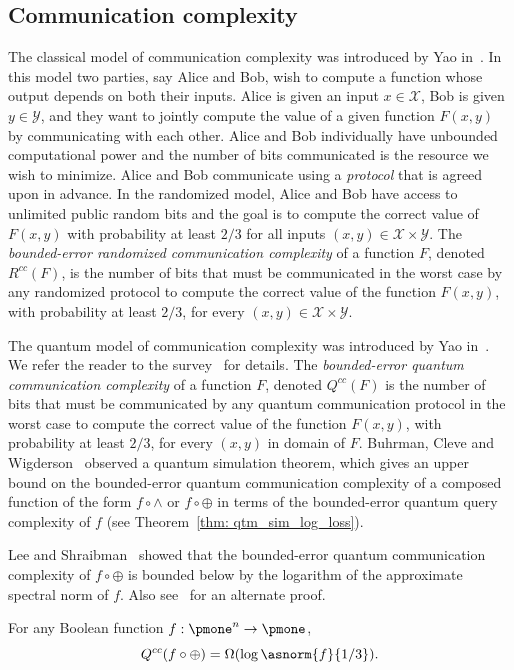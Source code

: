 \subsection{Communication complexity}
The classical model of communication complexity was introduced by Yao in~\cite{Yao79}. In this model two parties, say Alice and Bob, wish to compute a function whose output depends on both their inputs. Alice is given an input $x \in \mathcal{X}$, Bob is given $y \in \mathcal{Y}$, and they want to jointly compute the value of a given function $F(x,y)$ by communicating with each other.  Alice and Bob individually have unbounded computational power and the number of bits communicated is the resource we wish to minimize. Alice and Bob communicate using a \emph{protocol} that is agreed upon in advance. In the randomized model, Alice and Bob have access to unlimited public random bits and the goal is to compute the correct value of $F(x,y)$ with probability at least $2/3$ for all inputs $(x,y) \in \mathcal{X} \times \mathcal{Y}$. The \emph{bounded-error randomized communication complexity} of a function $F$, denoted $R^{cc}(F)$, is the number of bits that must be communicated in the worst case by any randomized protocol to compute the correct value of the function $F(x,y)$, with probability at least $2/3$, for every $(x,y) \in \mathcal{X} \times \mathcal{Y}$.

The quantum model of communication complexity was introduced by Yao in~\cite{Yao93}. 
We refer the reader to the survey~\cite{Wolf02} for details. The \emph{bounded-error quantum communication complexity} of a function $F$, denoted $Q^{cc}(F)$ is the number of bits that must be communicated by any quantum communication protocol in the worst case to compute the correct value of the function $F(x,y)$, with probability at least $2/3$, for every $(x,y)$ in domain of $F$. Buhrman, Cleve and Wigderson~\cite{BCW98} observed a quantum simulation theorem, which gives an upper bound on the bounded-error quantum communication complexity of a composed function of the form $f \circ \wedge$ or $f \circ \oplus$ in terms of the bounded-error quantum query complexity of $f$ (see Theorem~\ref{thm: qtm_sim_log_loss}).

Lee and Shraibman~\cite{LS09} showed that the bounded-error quantum communication complexity of $f \circ \oplus$ is bounded below by the logarithm of the approximate spectral norm of $f$. Also see~\cite{CM17} for an alternate proof.
\begin{theorem}[\cite{LS09}]\label{thm: LS}
For any Boolean function $f : \pmone^n \to \pmone$,
\[
Q^{cc}(f \circ \oplus) = \Omega(\log \asnorm{f}{1/3}).
\]
\end{theorem}



